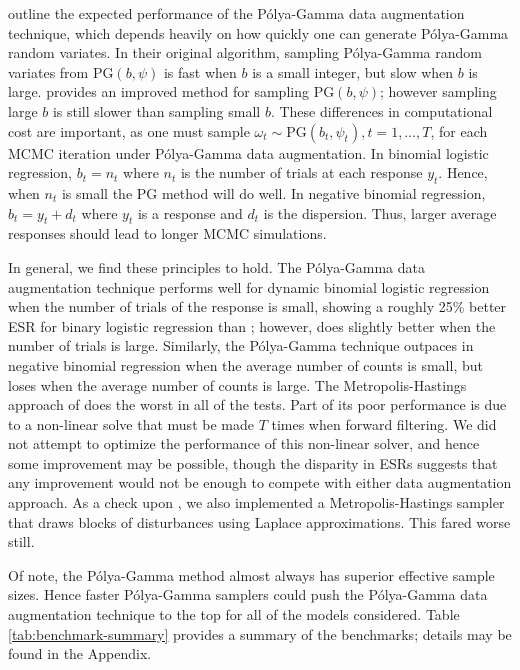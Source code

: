 \documentclass[12pt]{article}
\newcommand{\Polya}{P\'{o}lya}
\newcommand{\PG}{\text{PG}}
\begin{document}
\cite{polson-etal-2013} outline the expected performance of the \Polya-Gamma
data augmentation technique, which depends heavily on how quickly one can
generate \Polya-Gamma random variates.  In their original algorithm, sampling
\Polya-Gamma random variates from $\PG(b,\psi)$ is fast when $b$ is a small
integer, but slow when $b$ is large. \cite{windle-thesis-2013} provides an
improved method for sampling $\PG(b,\psi)$; however sampling large $b$ is still
slower than sampling small $b$.  These differences in computational cost are
important, as one must sample $\omega_t \sim \PG(b_t, \psi_t), t=1,\ldots,T$,
for each MCMC iteration under \Polya-Gamma data augmentation.  In binomial
logistic regression, $b_t = n_t$ where $n_t$ is the number of trials at each
response $y_t$.  Hence, when $n_t$ is small the PG method will do well.  In
negative binomial regression, $b_t = y_t + d_t$ where $y_t$ is a response and
$d_t$ is the dispersion.  Thus, larger average responses should lead to longer
MCMC simulations.

In general, we find these principles to hold.  The \Polya-Gamma data
augmentation technique performs well for dynamic binomial logistic regression
when the number of trials of the response is small, showing a roughly 25\%
better ESR for binary logistic regression than \cite{fussl-etal-2013}; however,
\cite{fussl-etal-2013} does slightly better when the number of trials is large.
Similarly, the \Polya-Gamma technique outpaces
\cite{fruhwirth-schnatter-etal-2009} in negative binomial regression when the
average number of counts is small, but loses when the average number of counts
is large.  The Metropolis-Hastings approach of \cite{migon-etal-2013} does the
worst in all of the tests.  Part of its poor performance is due to a non-linear
solve that must be made $T$ times when forward filtering.  We did not attempt to
optimize the performance of this non-linear solver, and hence some improvement
may be possible, though the disparity in ESRs suggests that any improvement
would not be enough to compete with either data augmentation approach.  As a
check upon \cite{migon-etal-2013}, we also implemented a Metropolis-Hastings
sampler that draws blocks of disturbances using Laplace approximations.  This
fared worse still.

Of note, the \Polya-Gamma method almost always has superior effective sample
sizes.  Hence faster \Polya-Gamma samplers could push the \Polya-Gamma data
augmentation technique to the top for all of the models considered.  Table
\ref{tab:benchmark-summary} provides a summary of the benchmarks; details may be
found in the Appendix.
\end{document}
